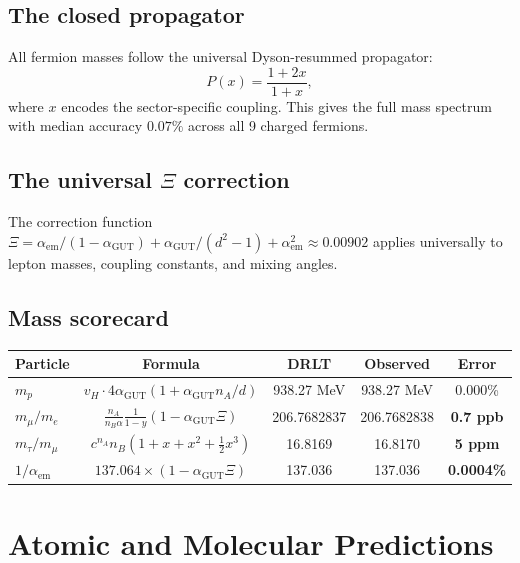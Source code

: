 \documentclass[12pt]{article}
\theoremstyle{definition}
\theoremstyle{remark}
\newcommand{\agut}{\alpha_{\mathrm{GUT}}}
\begin{document}
\subsection{The closed propagator}

All fermion masses follow the universal
Dyson-resummed propagator:
\begin{equation}
P(x) = \frac{1 + 2x}{1 + x},
\end{equation}
where $x$ encodes the sector-specific
coupling. This gives the full mass spectrum
with median accuracy $0.07\%$
across all 9 charged fermions.

\subsection{The universal $\Xi$ correction}

The correction function
$\Xi = \alpha_\mathrm{em}/(1-\agut)
+ \agut/(d^2-1) + \alpha_\mathrm{em}^2
\approx 0.00902$
applies universally to lepton masses,
coupling constants, and mixing angles.

\subsection{Mass scorecard}

\begin{center}
\begin{tabular}{lcccc}
\toprule
Particle & Formula & DRLT & Observed & Error \\
\midrule
$m_p$ & $v_H \cdot 4\agut (1+\agut n_A/d)$
  & 938.27 MeV & 938.27 MeV & 0.000\% \\
$m_\mu/m_e$ & $\frac{n_A}{n_B\alpha}\frac{1}{1-y}
  (1-\agut\Xi)$
  & 206.7682837 & 206.7682838 & \textbf{0.7 ppb} \\
$m_\tau/m_\mu$ & $c^{n_A} n_B (1+x+x^2+\frac{1}{2}x^3)$
  & 16.8169 & 16.8170 & \textbf{5 ppm} \\
$1/\alpha_\mathrm{em}$ & $137.064\times(1-\agut\Xi)$
  & 137.036 & 137.036 & \textbf{0.0004\%} \\
\bottomrule
\end{tabular}
\end{center}

\section{Atomic and Molecular Predictions}
\label{sec:chemistry}
\end{document}
